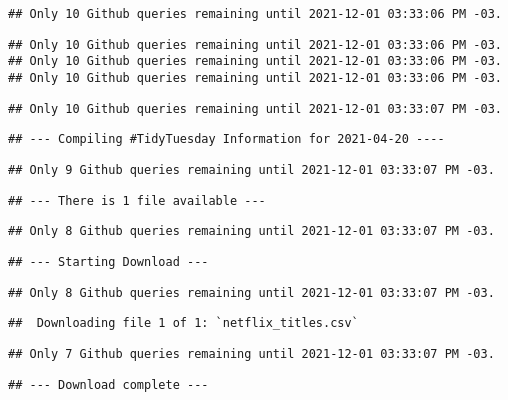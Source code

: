 \documentclass[
]{article}
\begin{document}
\begin{verbatim}
## Only 10 Github queries remaining until 2021-12-01 03:33:06 PM -03.
\end{verbatim}

\begin{verbatim}
## Only 10 Github queries remaining until 2021-12-01 03:33:06 PM -03.
## Only 10 Github queries remaining until 2021-12-01 03:33:06 PM -03.
## Only 10 Github queries remaining until 2021-12-01 03:33:06 PM -03.
\end{verbatim}

\begin{verbatim}
## Only 10 Github queries remaining until 2021-12-01 03:33:07 PM -03.
\end{verbatim}

\begin{verbatim}
## --- Compiling #TidyTuesday Information for 2021-04-20 ----
\end{verbatim}

\begin{verbatim}
## Only 9 Github queries remaining until 2021-12-01 03:33:07 PM -03.
\end{verbatim}

\begin{verbatim}
## --- There is 1 file available ---
\end{verbatim}

\begin{verbatim}
## Only 8 Github queries remaining until 2021-12-01 03:33:07 PM -03.
\end{verbatim}

\begin{verbatim}
## --- Starting Download ---
\end{verbatim}

\begin{verbatim}
## Only 8 Github queries remaining until 2021-12-01 03:33:07 PM -03.
\end{verbatim}

\begin{verbatim}
##  Downloading file 1 of 1: `netflix_titles.csv`
\end{verbatim}

\begin{verbatim}
## Only 7 Github queries remaining until 2021-12-01 03:33:07 PM -03.
\end{verbatim}

\begin{verbatim}
## --- Download complete ---
\end{verbatim}
\end{document}
